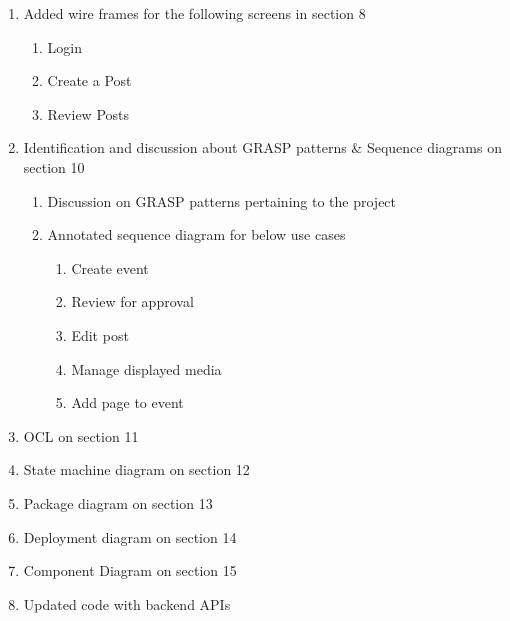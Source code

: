 \begin{enumerate}
    \item Added wire frames for the following screens in section 8
    \begin{enumerate}
        \item Login
        \item Create a Post
        \item Review Posts
    \end{enumerate}
    \item Identification and discussion about GRASP patterns \& Sequence diagrams on section 10
    \begin{enumerate}
        \item Discussion on GRASP patterns pertaining to the project
        \item Annotated sequence diagram for below use cases
        \begin{enumerate}
            \item Create event
            \item Review for approval
            \item Edit post
            \item Manage displayed media
            \item Add page to event
        \end{enumerate}
    \end{enumerate}
    \item OCL on section 11
    \item State machine diagram on section 12
    \item Package diagram on section 13
    \item Deployment diagram on section 14
    \item Component Diagram on section 15
    \item Updated code with backend APIs
\end{enumerate}